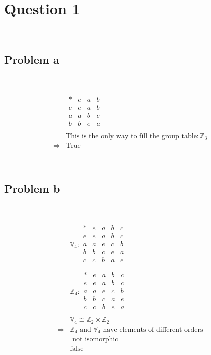 \documentclass{article}
\begin{document}
\section*{Question 1}

~

\subsection*{Problem a}

~

\begin{equation*}
    \begin{split}
        &\begin{array}{c|ccc}
           \ast&e&a&b\\
           \hline
           e&e&a&b\\
           a&a&b&e\\
           b&b&e&a\\ 
        \end{array}\\
        &\text{This is the only way to fill the group table}:\mathbb{Z} _3\\
        \Rightarrow&\text{True}
    \end{split}
\end{equation*}

~

\subsection*{Problem b}

~

\begin{equation*}
    \begin{split}
        &\mathbb{V}_4:\begin{array}{c|cccc}
            \ast&e&a&b&c\\
            \hline
            e&e&a&b&c\\
            a&a&e&c&b\\
            b&b&c&e&a\\
            c&c&b&a&e\\
        \end{array}\\
        &\mathbb{Z} _4:\begin{array}{c|cccc}
            \ast&e&a&b&c\\
            e&e&a&b&c\\
            a&a&e&c&b\\
            b&b&c&a&e\\
            c&c&b&e&a\\
        \end{array}\\
        &\mathbb{V} _4\cong \mathbb{Z} _2\times\mathbb{Z} _2\\
        \Rightarrow&\mathbb{Z} _4\text{ and }\mathbb{V} _4\text{ have elements of different orders}\\
        &\text{ not isomorphic}\\
        &\text{false}\\
    \end{split}
\end{equation*}
\end{document}
